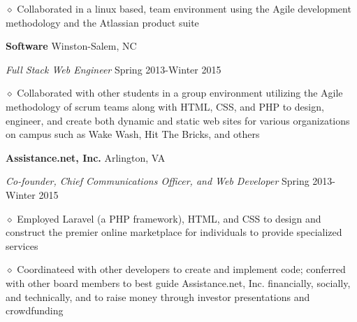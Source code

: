 \documentclass[executivepaper]{extarticle}
\begin{document}
\begin{center}
{\begin{minipage}{7.0in}
{\noindent $\diamond$ {\fontsize{12}{8}\selectfont Collaborated in a linux based, team environment using the Agile development methodology and the Atlassian product suite}}

\vspace{2mm}

{\noindent \textbf{\fontsize{12}{8} Software}} {\hfill \fontsize{10}{8}\selectfont Winston-Salem, NC}

\vspace{0.25mm}

{\noindent \textit{\fontsize{12}{8}\selectfont Full Stack Web Engineer}} {\hfill \fontsize{10}{8}\selectfont Spring 2013-Winter 2015}

\vspace{0.25mm}

{\noindent $\diamond$ {\fontsize{12}{8}\selectfont Collaborated with other students in a group environment utilizing the Agile methodology of scrum teams along with
HTML, CSS, and PHP to design, engineer, and create both dynamic and static web sites for various organizations on campus such as Wake Wash, Hit The Bricks, and others}}

\vspace{2mm}

{\noindent \textbf{\fontsize{12}{8}\selectfont Assistance.net, Inc.}} {\hfill \fontsize{10}{8}\selectfont Arlington, VA}

\vspace{0.25mm}

{\noindent \textit{\fontsize{12}{8}\selectfont Co-founder, Chief Communications Officer, and Web Developer}} {\hfill \fontsize{10}{8}\selectfont Spring 2013-Winter 2015}

\vspace{0.25mm}

{\noindent $\diamond$ {\fontsize{12}{8}\selectfont Employed Laravel (a PHP framework), HTML, and CSS to design and construct the premier online marketplace for individuals to provide specialized services}}

\vspace{0.25mm}

{\noindent $\diamond$ {\fontsize{12}{8}\selectfont Coordinateed with other developers to create and implement code; conferred with other board members to best guide Assistance.net, Inc. financially, socially, and technically,
and to raise money through investor presentations and crowdfunding}}

\vspace{2mm}


\end{minipage}}
\end{center}
\end{document}
